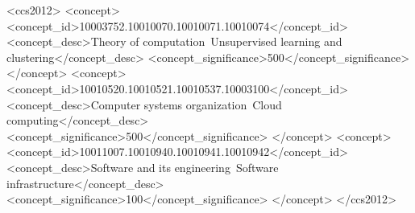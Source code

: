 \documentclass[sigconf]{acmart}
\begin{document}
%
%
  \begin{CCSXML}
<ccs2012>
<concept>
<concept_id>10003752.10010070.10010071.10010074</concept_id>
<concept_desc>Theory of computation~Unsupervised learning and clustering</concept_desc>
<concept_significance>500</concept_significance>
</concept>
<concept>
<concept_id>10010520.10010521.10010537.10003100</concept_id>
<concept_desc>Computer systems organization~Cloud computing</concept_desc>
<concept_significance>500</concept_significance>
</concept>
<concept>
<concept_id>10011007.10010940.10010941.10010942</concept_id>
<concept_desc>Software and its engineering~Software infrastructure</concept_desc>
<concept_significance>100</concept_significance>
</concept>
</ccs2012>
\end{CCSXML}



\maketitle

%

 
\end{document}

